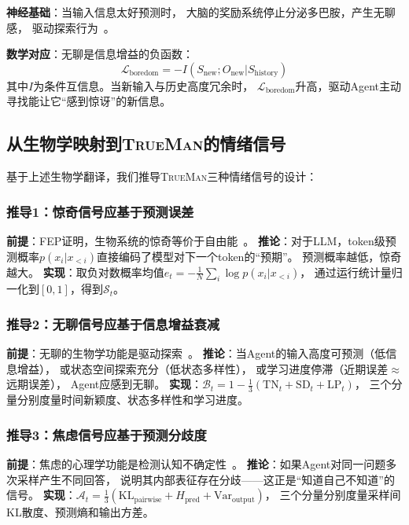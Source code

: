\documentclass[11pt,a4paper]{article}
\newcommand{\TrueMan}{\textsc{TrueMan}}
\newcommand{\surprise}{\mathcal{S}}
\newcommand{\boredom}{\mathcal{B}}
\newcommand{\anxiety}{\mathcal{A}}
\begin{document}
\textbf{神经基础}：当输入信息太好预测时，
大脑的奖励系统停止分泌多巴胺，产生无聊感，
驱动探索行为~\cite{colas2022autotelic}。

\textbf{数学对应}：无聊是信息增益的负函数：
\begin{equation}
\mathcal{L}_{\text{boredom}} = -I(S_{\text{new}}; O_{\text{new}} | S_{\text{history}})
\end{equation}
其中$I$为条件互信息。当新输入与历史高度冗余时，
$\mathcal{L}_{\text{boredom}}$升高，驱动Agent主动寻找能让它``感到惊讶''的新信息。

\subsection{从生物学映射到\TrueMan{}的情绪信号}

基于上述生物学翻译，我们推导\TrueMan{}三种情绪信号的设计：

\subsubsection{推导1：惊奇信号应基于预测误差}

\textbf{前提}：FEP证明，生物系统的惊奇等价于自由能~\cite{friston2022active}。
\textbf{推论}：对于LLM，token级预测概率$p(x_i|x_{<i})$直接编码了模型对下一个token的``预期''。
预测概率越低，惊奇越大。
\textbf{实现}：取负对数概率均值$e_t = -\frac{1}{N}\sum_{i}\log p(x_i|x_{<i})$，
通过运行统计量归一化到$[0,1]$，得到$\surprise_t$。

\subsubsection{推导2：无聊信号应基于信息增益衰减}

\textbf{前提}：无聊的生物学功能是驱动探索~\cite{colas2022autotelic}。
\textbf{推论}：当Agent的输入高度可预测（低信息增益），
或状态空间探索充分（低状态多样性），
或学习进度停滞（近期误差$\approx$远期误差），
Agent应感到无聊。
\textbf{实现}：$\boredom_t = 1 - \frac{1}{3}(\text{TN}_t + \text{SD}_t + \text{LP}_t)$，
三个分量分别度量时间新颖度、状态多样性和学习进度。

\subsubsection{推导3：焦虑信号应基于预测分歧度}

\textbf{前提}：焦虑的心理学功能是检测认知不确定性~\cite{kawato2023metacognitive}。
\textbf{推论}：如果Agent对同一问题多次采样产生不同回答，
说明其内部表征存在分歧——这正是``知道自己不知道''的信号。
\textbf{实现}：$\anxiety_t = \frac{1}{3}(\text{KL}_{\text{pairwise}} + H_{\text{pred}} + \text{Var}_{\text{output}})$，
三个分量分别度量采样间KL散度、预测熵和输出方差。
\end{document}
